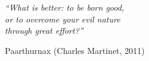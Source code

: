\begin{epigrafe}
    \vspace*{\fill}
	\begin{flushright}
		\textit{``What is better: to be born good,\\or to overcome your evil nature\\through great effort?''}

		Paarthurnax (Charles Martinet, 2011)
	\end{flushright}
\end{epigrafe}